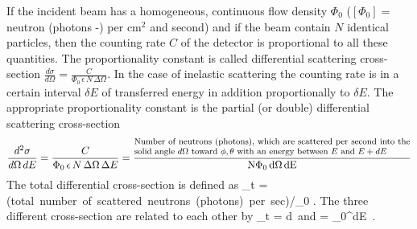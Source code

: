 If the incident beam has a homogeneous, continuous flow
density $\Phi_0$ ($[\Phi_0 ] = $ neutron (photons -) per cm$^2$
and second) and if the beam contain $N$ identical particles, then
the counting rate $C$ of the detector is proportional to all these
quantities. The proportionality constant is called differential
scattering cross-section $ \frac{d\sigma}{d\Omega } =
\frac{C}{\Phi_0 \, \epsilon \, N \, \Delta\Omega } $.  In the case
of inelastic scattering the counting rate is in a certain interval
$\delta E$ of transferred energy in addition proportionally to
$\delta E$. The appropriate proportionality constant is the
partial (or double) differential scattering cross-section
$$
\frac{d^2\sigma}{d\Omega\, dE} = \frac{C}{\Phi_0\, \epsilon\, N\,
\Delta\Omega \,\Delta E } = \rm
\frac{\mbox{\parbox[b]{9.4cm}{\footnotesize Number of neutrons
(photons), which are scattered per second into the solid angle
$d\Omega$ toward $\phi, \theta$ with an energy between $E$ and
$E+dE$}} }{N \Phi_0\, d\Omega\, dE}
$$
The total differential cross-section is defined as
\BE
\sigma_t = (\mbox{total number of scattered neutrons (photons) per sec})/\Phi_0 .
\EE
The three different cross-section are related to each other by
\BE
\sigma_t = \int d\Omega\,  \qquad \mbox{and}
\qquad {} = \int_0^{\infty}dE\,
.
\EE

